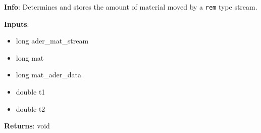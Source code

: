 \textbf{Info}: Determines and stores the amount of material moved by a
\texttt{rem} type stream.

\noindent \textbf{Inputs}:
\begin{itemize}
\item{long ader\_mat\_stream}
\item{long mat}
\item{long mat\_ader\_data}
\item{double t1}
\item{double t2}
\end{itemize}

\noindent \textbf{Returns}: void
